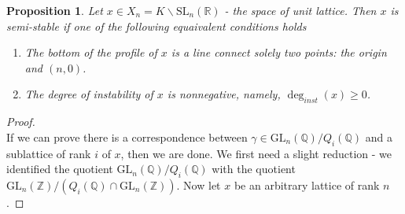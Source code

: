 \documentclass[12pt]{article} %
\newtheorem{prop}[definition]{Proposition}
\begin{document}
\begin{prop}
    Let $x \in X_n = K \backslash \text{SL}_n(\mathbb{R})$ - the space of unit lattice. Then $x$ is semi-stable if one of the following equaivalent
    conditions holds
    \begin{enumerate}
        \item The bottom of the profile of $x$ is a line connect solely two points: the origin and $(n,0)$.
        \item The degree of instability of $x$ is nonnegative, namely, $\deg_{inst}(x) \ge 0$.
    \end{enumerate}
\end{prop}
\begin{proof}
    \hfill \\
    If we can prove there is a correspondence between
    $\gamma \in \text{GL}_n(\mathbb{Q})/Q_i(\mathbb{Q})$ and a sublattice of rank $i$ of $x$, then we are done.
    We first need a slight reduction - we identified the quotient $\text{GL}_n(\mathbb{Q})/Q_i(\mathbb{Q})$ with
    the quotient $\text{GL}_n(\mathbb{Z})/(Q_i(\mathbb{Q}) \cap \text{GL}_n(\mathbb{Z})) $. Now let $x$ be an arbitrary lattice of rank $n$.


\end{proof}
\end{document}
